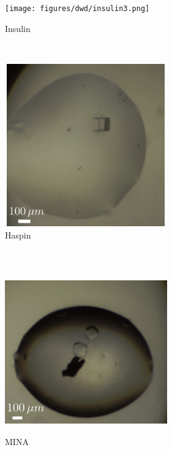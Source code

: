 \begin{figure}
        \centering
        \begin{subfigure}[b]{1\textwidth}
                \centering
                \texttt{[image: figures/dwd/insulin3.png]}
                \caption{Insulin}
                \label{fig: Cubic insulin crystals}
        \end{subfigure}
				\\
        \begin{subfigure}[b]{1\textwidth}
                \centering
                \includegraphics[width=7cm,height=7cm]{figures/dwd/haspin2.png}
                \caption{Haspin}
                \label{fig: Cubic haspin crytals}
        \end{subfigure}
				\\
        \begin{subfigure}[b]{1\textwidth}
                \centering
                \includegraphics[width=7cm,height=7cm]{figures/dwd/mina2.png}
                \caption{MINA}
                \label{fig: Cubic MINA crystals}
        \end{subfigure}
				\caption{}
        \label{figcrystals}
\end{figure}

